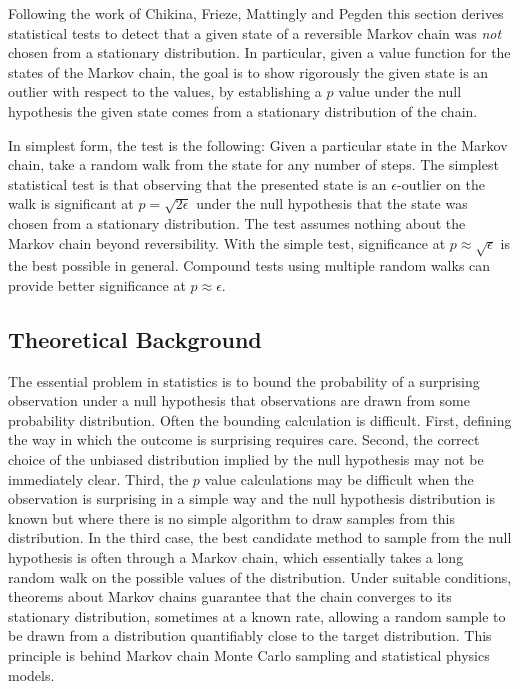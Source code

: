 \documentclass[12pt]{article}
\begin{document}
Following the work of Chikina, Frieze, Mattingly and Pegden
\cite{doi:10.1080/2330443X.2020.1806763, Chikina2860, Chikina2019} this
section derives statistical tests to detect that a given state of a
reversible Markov chain was \emph{not} chosen from a stationary
distribution.  In particular, given a value function for the states of
the Markov chain, the goal is to show rigorously the given state is an
outlier with respect to the values, by establishing a \( p \) value
under the null hypothesis the given state comes from a stationary
distribution of the chain.

In simplest form, the test is the following:  Given a particular state
in the Markov chain, take a random walk from the state for any
number of steps.  The simplest statistical test is that observing that
the presented state is an \( \epsilon \)-outlier on the walk is
significant at \( p = \sqrt{2\epsilon} \) under the null hypothesis that
the state was chosen from a stationary distribution.  The test assumes
nothing about the Markov chain beyond reversibility.  With the simple
test, significance at \( p \approx \sqrt{\epsilon} \) is the best
possible in general.  Compound tests using multiple random
walks can provide better significance at \( p \approx \epsilon \).

\subsection*{Theoretical Background}

The essential problem in statistics is to bound the probability of a
surprising observation under a null hypothesis that observations are
drawn from some probability distribution.  Often the bounding
calculation is difficult.  First, defining the way in which the outcome
is surprising requires care.  Second, the correct choice of the unbiased
distribution implied by the null hypothesis may not be immediately
clear.
Third, the \( p \) value calculations may be difficult when
the observation is surprising in a simple way and the null hypothesis
distribution is known but where there is no simple algorithm to draw
samples from this distribution.  In the third case, the best candidate
method to sample from the null hypothesis is often through a Markov
chain, which essentially takes a long random walk on the possible values
of the distribution.  Under suitable conditions, theorems about Markov
chains guarantee that the chain converges to its stationary
distribution, sometimes at a known rate, allowing a random sample to be
drawn from a distribution quantifiably close to the target distribution.
This principle is behind Markov chain Monte Carlo sampling and
statistical physics models.
\end{document}
